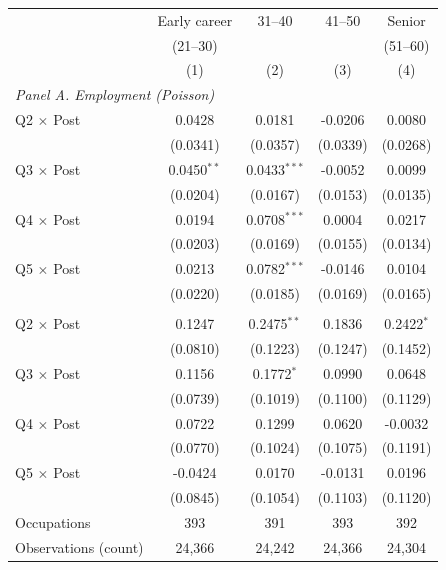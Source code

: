 \begin{tabular}{lcccc}
\toprule
 & Early career & 31--40 & 41--50 & Senior \\
 & (21--30) &  &  & (51--60) \\
 & (1) & (2) & (3) & (4) \\
\midrule
\multicolumn{5}{l}{\textit{Panel A. Employment (Poisson)}} \\
Q2 $\times$ Post & 0.0428 & 0.0181 & -0.0206 & 0.0080 \\
 & (0.0341) & (0.0357) & (0.0339) & (0.0268) \\
Q3 $\times$ Post & 0.0450$^{**}$ & 0.0433$^{***}$ & -0.0052 & 0.0099 \\
 & (0.0204) & (0.0167) & (0.0153) & (0.0135) \\
Q4 $\times$ Post & 0.0194 & 0.0708$^{***}$ & 0.0004 & 0.0217 \\
 & (0.0203) & (0.0169) & (0.0155) & (0.0134) \\
Q5 $\times$ Post & 0.0213 & 0.0782$^{***}$ & -0.0146 & 0.0104 \\
 & (0.0220) & (0.0185) & (0.0169) & (0.0165) \\
\addlinespace
\multicolumn{5}{l}{\textit{Panel B. New hires (Poisson)}} \\
Q2 $\times$ Post & 0.1247 & 0.2475$^{**}$ & 0.1836 & 0.2422$^{*}$ \\
 & (0.0810) & (0.1223) & (0.1247) & (0.1452) \\
Q3 $\times$ Post & 0.1156 & 0.1772$^{*}$ & 0.0990 & 0.0648 \\
 & (0.0739) & (0.1019) & (0.1100) & (0.1129) \\
Q4 $\times$ Post & 0.0722 & 0.1299 & 0.0620 & -0.0032 \\
 & (0.0770) & (0.1024) & (0.1075) & (0.1191) \\
Q5 $\times$ Post & -0.0424 & 0.0170 & -0.0131 & 0.0196 \\
 & (0.0845) & (0.1054) & (0.1103) & (0.1120) \\
\midrule
Occupations & 393 & 391 & 393 & 392 \\
Observations (count) & 24,366 & 24,242 & 24,366 & 24,304 \\
\bottomrule
\end{tabular}

